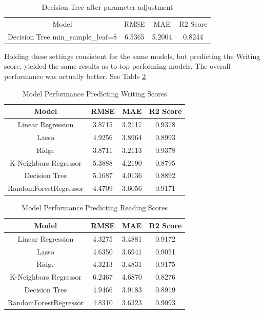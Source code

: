 \documentclass[man,floatsintext]{apa6} %
\begin{document}
\begin{table}[H]
    \centering
    \begin{tabular}{|c|c|c|c|}
    \hline
        Model & RMSE & MAE & R2 Score\\
        Decision Tree min\_sample\_leaf=8 & 6.5365 & 5.2004 & 0.8244\\
        \hline
    \end{tabular}
    \caption{Decision Tree after parameter adjustment}
    \label{tab:DecTreeControlled}
\end{table}
Holding these settings consistent for the same models, but predicting the Writing score, yielded the same results as to top performing models. The overall performance was actually better. See Table \ref{tab:InitModelPerfWrite}
\begin{table}[H]
    \centering
    \begin{tabular}{|c|c|c|c|}
    \hline
         Model & RMSE & MAE & R2 Score\\
         \hline\hline
         Linear Regression & 3.8715 & 3.2117 & 0.9378\\
         \hline
         Lasso & 4.9256 & 3.8964 & 0.8993\\
         \hline
         Ridge & 3.8711 & 3.2113 & 0.9378\\
         \hline
         K-Neighbors Regressor & 5.3888 & 4.2190 & 0.8795\\
         \hline
         Decision Tree & 5.1687 & 4.0136 & 0.8892\\
         \hline
         RandomForestRegressor & 4.4709 & 3.6056 & 0.9171\\
         \hline
    \end{tabular}
    \caption{Model Performance Predicting Writing Scores}
    \label{tab:InitModelPerfWrite}
\end{table}
\begin{table}[H]
    \centering
    \begin{tabular}{|c|c|c|c|}
    \hline
         Model & RMSE & MAE & R2 Score\\
         \hline\hline
         Linear Regression & 4.3275 & 3.4881 & 0.9172\\
         \hline
         Lasso & 4.6350 & 3.6941 & 0.9051\\
         \hline
         Ridge & 4.3213 & 3.4831 & 0.9175\\
         \hline
         K-Neighbors Regressor & 6.2467 & 4.6870 & 0.8276\\
         \hline
         Decision Tree & 4.9466 & 3.9183 & 0.8919\\
         \hline
         RandomForestRegressor & 4.8310 & 3.6323 & 0.9093\\
         \hline
    \end{tabular}
    \caption{Model Performance Predicting Reading Scores}
    \label{tab:InitModelPerfRead}
\end{table}
\end{document}
